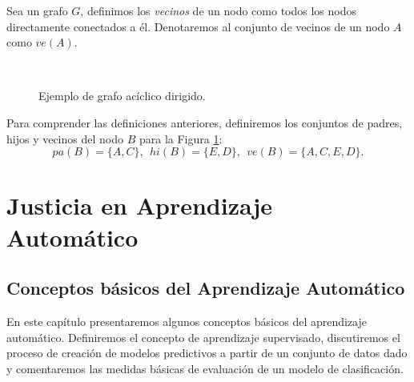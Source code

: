 \documentclass[oneside,openright,titlepage,numbers=noenddot,openany,headinclude,footinclude=true,
cleardoublepage=empty,abstractoff,BCOR=5mm,paper=a4,fontsize=12pt,main=spanish]{scrreprt}
\begin{document}
\begin{definition}
Sea un grafo $G$, definimos los \textit{vecinos} de un nodo como todos los nodos directamente conectados a él. Denotaremos al conjunto de vecinos de un nodo $A$ como $ve(A)$.
\end{definition}\

\begin{figure}[h]
\centering
{}
\caption{Ejemplo de grafo acíclico dirigido.}
\label{fig:relations}
\end{figure}

\begin{example}
Para comprender las definiciones anteriores, definiremos los conjuntos de padres, hijos y vecinos del nodo $B$ para la Figura \ref{fig:relations}: $$pa(B)=\{A,C\}, \ \ hi(B)=\{E,D\}, \ \ ve(B)=\{A,C,E,D\}.$$
\end{example}

\part{Justicia en Aprendizaje Automático}


\chapter{Conceptos básicos del Aprendizaje Automático}

En este capítulo presentaremos algunos conceptos básicos del aprendizaje automático. Definiremos el concepto de aprendizaje supervisado, discutiremos el proceso de creación de modelos predictivos a partir de un conjunto de datos dado y comentaremos las medidas básicas de evaluación de un modelo de clasificación.
\end{document}
